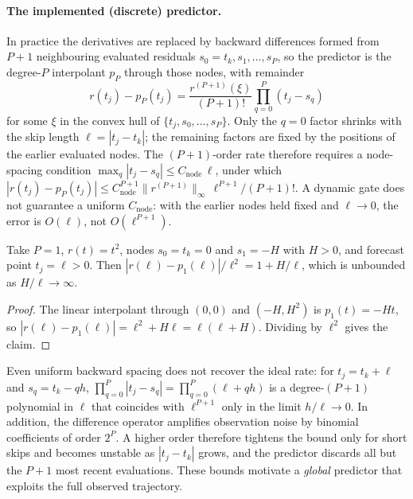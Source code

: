 \paragraph{The implemented (discrete) predictor.} In practice the derivatives are replaced by backward differences formed from $P{+}1$ neighbouring evaluated residuals $s_0=t_k,s_1,\dots,s_P$, so the predictor is the degree-$P$ interpolant $p_P$ through those nodes, with remainder
\begin{equation}\label{eq:respect-interp}
  r(t_j)-p_P(t_j) = \frac{r^{(P+1)}(\xi)}{(P+1)!}\prod_{q=0}^{P}(t_j-s_q)
\end{equation}
for some $\xi$ in the convex hull of $\{t_j,s_0,\dots,s_P\}$. Only the $q=0$ factor shrinks with the skip length $\ell=|t_j-t_k|$; the remaining factors are fixed by the positions of the earlier evaluated nodes. The $(P{+}1)$-order rate therefore requires a node-spacing condition $\max_q|t_j-s_q|\le C_{\mathrm{node}}\,\ell$, under which $|r(t_j)-p_P(t_j)|\le C_{\mathrm{node}}^{P+1}\|r^{(P+1)}\|_\infty\,\ell^{P+1}/(P+1)!$. A dynamic gate does not guarantee a uniform $C_{\mathrm{node}}$: with the earlier nodes held fixed and $\ell\to 0$, the error is $O(\ell)$, not $O(\ell^{P+1})$.

\begin{proposition}\label{prop:respect-sharp}
Take $P=1$, $r(t)=t^2$, nodes $s_0=t_k=0$ and $s_1=-H$ with $H>0$, and forecast point $t_j=\ell>0$. Then $|r(\ell)-p_1(\ell)|/\ell^2 = 1 + H/\ell$, which is unbounded as $H/\ell\to\infty$.
\end{proposition}
\begin{proof}
The linear interpolant through $(0,0)$ and $(-H,H^2)$ is $p_1(t)=-Ht$, so $|r(\ell)-p_1(\ell)| = \ell^2+H\ell = \ell(\ell+H)$. Dividing by $\ell^2$ gives the claim.
\end{proof}

Even uniform backward spacing does not recover the ideal rate: for $t_j=t_k+\ell$ and $s_q=t_k-qh$, $\prod_{q=0}^P|t_j-s_q|=\prod_{q=0}^P(\ell+qh)$ is a degree-$(P{+}1)$ polynomial in $\ell$ that coincides with $\ell^{P+1}$ only in the limit $h/\ell\to 0$. In addition, the difference operator amplifies observation noise by binomial coefficients of order $2^P$. A higher order therefore tightens the bound only for short skips and becomes unstable as $|t_j-t_k|$ grows, and the predictor discards all but the $P{+}1$ most recent evaluations. These bounds motivate a \emph{global} predictor that exploits the full observed trajectory.


